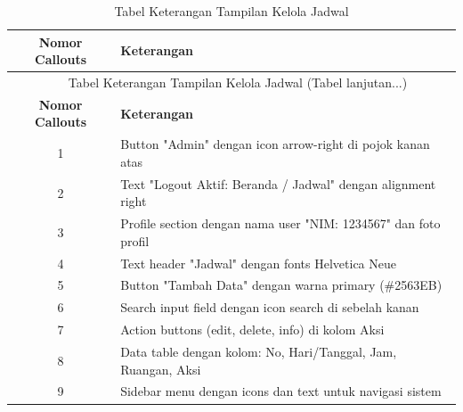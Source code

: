 \begin{enumerate}
	      \begin{longtable}{c p{}}
		      \caption{Tabel Keterangan Tampilan Kelola Jadwal}
		      \label{tab:ui-jadwal}                                                                                                 \\
		      \hline
		      \textbf{Nomor Callouts} & \textbf{Keterangan}                                                                         \\
		      \hline
		      \endfirsthead

		      \multicolumn{2}{c}{\small\tablename\ \thetable\ {Tabel Keterangan Tampilan Kelola Jadwal} \space (Tabel lanjutan...)} \\
		      \hline
		      \textbf{Nomor Callouts} & \textbf{Keterangan}                                                                         \\
		      \hline
		      \endhead

		      1                       & Button "Admin" dengan icon arrow-right di pojok kanan atas                                  \\
		      2                       & Text "Logout Aktif: Beranda / Jadwal" dengan alignment right                                \\
		      3                       & Profile section dengan nama user "NIM: 1234567" dan foto profil                             \\
		      4                       & Text header "Jadwal" dengan fonts Helvetica Neue                                            \\
		      5                       & Button "Tambah Data" dengan warna primary (\#2563EB)                                        \\
		      6                       & Search input field dengan icon search di sebelah kanan                                      \\
		      7                       & Action buttons (edit, delete, info) di kolom Aksi                                           \\
		      8                       & Data table dengan kolom: No, Hari/Tanggal, Jam, Ruangan, Aksi                               \\
		      9                       & Sidebar menu dengan icons dan text untuk navigasi sistem                                    \\
		      \hline
	      \end{longtable}


\end{enumerate}
